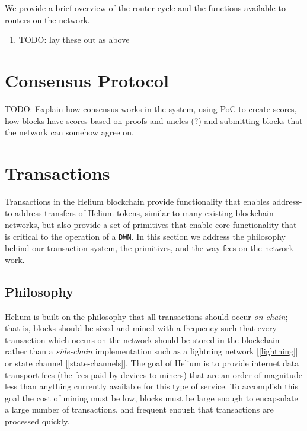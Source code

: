 \documentclass[letterpaper,11pt]{article}
\newcommand{\todo}[1]{}
\renewcommand{\todo}[1]{{\color{red} TODO: {#1}}}
\begin{document}
We provide a brief overview of the router cycle and the functions available to routers on the network.

\begin{enumerate}
  \item \todo{lay these out as above}
\end{enumerate}

\newpage

\section{Consensus Protocol}\label{consensus}

\todo{Explain how consensus works in the system, using PoC to create scores, how blocks have scores based on proofs and uncles (?) and submitting blocks that the network can somehow agree on.}

\newpage

\section{Transactions}\label{transactions}

Transactions in the Helium blockchain provide functionality that enables address-to-address transfers of Helium tokens, similar to many existing blockchain networks, but also provide a set of primitives that enable core functionality that is critical to the operation of a \verb|DWN|. In this section we address the philosophy behind our transaction system, the primitives, and the way fees on the network work.

\subsection{Philosophy}

Helium is built on the philosophy that all transactions should occur \emph{on-chain}; that is, blocks should be sized and mined with a frequency such that every transaction which occurs on the network should be stored in the blockchain rather than a \emph{side-chain} implementation such as a lightning network [\ref{lightning}] or state channel [\ref{state-channels}]. The goal of Helium is to provide internet data transport fees (the fees paid by devices to miners) that are an order of magnitude less than anything currently available for this type of service. To accomplish this goal the cost of mining must be low, blocks must be large enough to encapsulate a large number of transactions, and frequent enough that transactions are processed quickly.\newline
\end{document}
